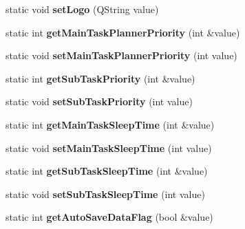 \begin{DoxyCompactItemize}
\item 
\hypertarget{classAppConf_aec83396a40da236fde7fc205ccd243b5}{static void {\bfseries set\-Logo} (Q\-String value)}\label{classAppConf_aec83396a40da236fde7fc205ccd243b5}

\item 
\hypertarget{classAppConf_a026aa96ae962b0a1004d680c21bdead3}{static int {\bfseries get\-Main\-Task\-Planner\-Priority} (int \&value)}\label{classAppConf_a026aa96ae962b0a1004d680c21bdead3}

\item 
\hypertarget{classAppConf_aa6a7ff311adf83e0a83626c9c3fac956}{static void {\bfseries set\-Main\-Task\-Planner\-Priority} (int value)}\label{classAppConf_aa6a7ff311adf83e0a83626c9c3fac956}

\item 
\hypertarget{classAppConf_a0edc52ce2e8712f7d27b9c54523c466a}{static int {\bfseries get\-Sub\-Task\-Priority} (int \&value)}\label{classAppConf_a0edc52ce2e8712f7d27b9c54523c466a}

\item 
\hypertarget{classAppConf_a024de7f18f6f7e6b6105c871af4006cf}{static void {\bfseries set\-Sub\-Task\-Priority} (int value)}\label{classAppConf_a024de7f18f6f7e6b6105c871af4006cf}

\item 
\hypertarget{classAppConf_ae1c04cceb85a048484849f64e762fed4}{static int {\bfseries get\-Main\-Task\-Sleep\-Time} (int \&value)}\label{classAppConf_ae1c04cceb85a048484849f64e762fed4}

\item 
\hypertarget{classAppConf_a643aedf798fe534520ea5a55b98fc71b}{static void {\bfseries set\-Main\-Task\-Sleep\-Time} (int value)}\label{classAppConf_a643aedf798fe534520ea5a55b98fc71b}

\item 
\hypertarget{classAppConf_a7c2900270dfeca083c2668ec808ff6e2}{static int {\bfseries get\-Sub\-Task\-Sleep\-Time} (int \&value)}\label{classAppConf_a7c2900270dfeca083c2668ec808ff6e2}

\item 
\hypertarget{classAppConf_a496b436339a8bd6a1d9c6c52330f69b7}{static void {\bfseries set\-Sub\-Task\-Sleep\-Time} (int value)}\label{classAppConf_a496b436339a8bd6a1d9c6c52330f69b7}

\item 
\hypertarget{classAppConf_a9f86a6e8c7e846c255581e85da814144}{static int {\bfseries get\-Auto\-Save\-Data\-Flag} (bool \&value)}\label{classAppConf_a9f86a6e8c7e846c255581e85da814144}


\end{DoxyCompactItemize}
